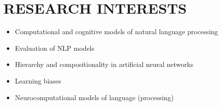 \section{RESEARCH INTERESTS}

\begin{itemize}
    \item Computational and cognitive models of natural language processing
    \item Evaluation of NLP models
    \item Hierarchy and compositionality in artificial neural networks
    \item Learning biases
    \item Neurocomputational models of language (processing)
\end{itemize}
